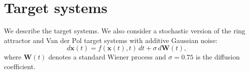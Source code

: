 \documentclass{article}
\theoremstyle{definition} \newtheorem{definition}{Definition}  \newtheorem{example}{Example}
\theoremstyle{remark} \newtheorem{remark}{Remark}
\newcounter{ct}
\begin{document}


%








\newpage
 \section{Target systems}\label{sec:target_systems}
We describe the target systems.
We also consider a stochastic version of the ring attractor and Van der Pol target systems with additive Gaussian noise:
\begin{equation}\label{eq:sde}
d\mathbf{x}(t) = f(\mathbf{x}(t), t)\,dt + \sigma\,d\mathbf{W}(t),
\end{equation}
where $\mathbf{W}(t)$ denotes a standard Wiener process and $\sigma = 0.75$ is the diffusion coefficient.
\end{document}
